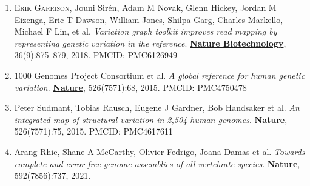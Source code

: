 \documentclass{nihbiosketch}
\newcommand{\hijournal}[1]{{\bf {\uline{#1}}}}
\begin{document}
\begin{statement}



  

\begin{enumerate}[label=\alph*.]

\item \textsc{Erik Garrison}, Jouni Sirén, Adam M Novak, Glenn Hickey, Jordan M Eizenga, Eric T Dawson, William Jones, Shilpa Garg, Charles Markello, Michael F Lin, et al. \emph{Variation graph toolkit improves read mapping by representing genetic variation in the reference}. \hijournal{Nature Biotechnology}, 36(9):875–879, 2018. PMCID: PMC6126949


\item 1000 Genomes Project Consortium et al. \emph{A global reference for human genetic variation}. \hijournal{Nature}, 526(7571):68, 2015. PMCID: PMC4750478

\item Peter Sudmant, Tobias Rausch, Eugene J Gardner, Bob Handsaker et al. \emph{An integrated map of structural variation in 2,504 human genomes}. \hijournal{Nature}, 526(7571):75, 2015. PMCID: PMC4617611

\item Arang Rhie, Shane A McCarthy, Olivier Fedrigo, Joana Damas et al. \emph{Towards complete and error-free genome assemblies of all vertebrate species}. \hijournal{Nature}, 592(7856):737, 2021.

\end{enumerate}

\end{statement}
\end{document}
